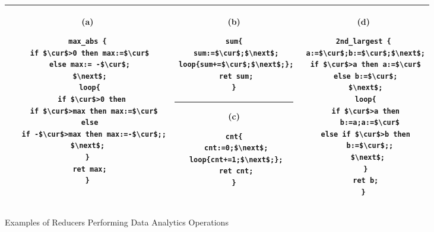 \begin{figure}
	\centering
	\lstset{language=C,
		basicstyle=\ttfamily\scriptsize}
	\begin{tabular}{|c|c|c|}
		\hline
		\begin{minipage}[t]{0.39\textwidth}
			(a)
			\begin{lstlisting}[mathescape=true]
max_abs {
 if $\cur$>0 then max:=$\cur$
 else max:= -$\cur$;
 $\next$;
 loop{
  if $\cur$>0 then
   if $\cur$>max then max:=$\cur$
  else 
   if -$\cur$>max then max:=-$\cur$;;
  $\next$;  
 } 
 ret max;
}
	\end{lstlisting}
		\end{minipage}&
		\begin{minipage}[t]{0.27\textwidth}
			(b)
			\begin{lstlisting}[mathescape=true]
sum{
 sum:=$\cur$;$\next$;
 loop{sum+=$\cur$;$\next$;};
 ret sum;
}
			\end{lstlisting}
\hrule\vspace{0.1cm}			
			(c)
			\begin{lstlisting}[mathescape=true]
cnt{
 cnt:=0;$\next$;
 loop{cnt+=1;$\next$;};
 ret cnt;
}
			\end{lstlisting}			
		\end{minipage}&
		\begin{minipage}[t]{0.30\textwidth}
			(d) 
			\begin{lstlisting}[mathescape=true]
2nd_largest {
 a:=$\cur$;b:=$\cur$;$\next$;
 if $\cur$>a then a:=$\cur$
 else b:=$\cur$;
 $\next$;
 loop{
  if $\cur$>a then 
   b:=a;a:=$\cur$
  else if $\cur$>b then 
   b:=$\cur$;;
  $\next$;
 }
 ret b;
}
			\end{lstlisting}		
		\end{minipage}\\
		\hline		
	\end{tabular}
	\caption{Examples of Reducers Performing Data Analytics Operations}
	\label{fig:examples}
\end{figure}